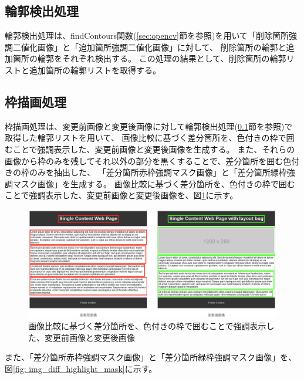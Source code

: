 \subsection{輪郭検出処理}\label{subsec:contour_detection_processing}
輪郭検出処理は、findContours関数(\ref{sec:opencv}節を参照)を用いて「削除箇所強調二値化画像」と「追加箇所強調二値化画像」に対して、
削除箇所の輪郭と追加箇所の輪郭をそれぞれ検出する。
この処理の結果として、削除箇所の輪郭リストと追加箇所の輪郭リストを取得する。

\subsection{枠描画処理}\label{subsec:Bounding box drawing process}
枠描画処理は、変更前画像と変更後画像に対して輪郭検出処理(\ref{subsec:contour_detection_processing}節を参照)で取得した輪郭リストを用いて、
画像比較に基づく差分箇所を、色付きの枠で囲むことで強調表示した、変更前画像と変更後画像を生成する。
また、それらの画像から枠のみを残してそれ以外の部分を黒くすることで、差分箇所を囲む色付きの枠のみを抽出した、
「差分箇所赤枠強調マスク画像」と「差分箇所緑枠強調マスク画像」を生成する。
画像比較に基づく差分箇所を、色付きの枠で囲むことで強調表示した、変更前画像と変更後画像を、図\ref{fig: img_diff_highlight}に示す。
\begin{figure}[tp]
    \begin{center}
        \includegraphics[width=1.0\columnwidth]{image/4_img_diff_highlight.png}
        \caption{画像比較に基づく差分箇所を、色付きの枠で囲むことで強調表示した、変更前画像と変更後画像}
        \label{fig: img_diff_highlight}
    \end{center}
\end{figure}
また、「差分箇所赤枠強調マスク画像」と「差分箇所緑枠強調マスク画像」を、図\ref{fig: img_diff_highlight_mask}に示す。
